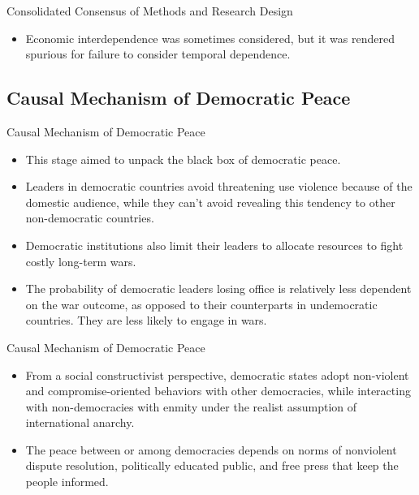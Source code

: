 \documentclass{beamer}
\begin{document}
	\begin{frame}{Consolidated Consensus of Methods and Research Design}
		\begin{itemize}
			\item Economic interdependence was sometimes considered, \autocite{onealClassicalLiberalsWere1997,russettTriangulatingPeaceDemocracy2001} but it was rendered spurious for failure to consider temporal dependence. \autocite{beckTakingTimeSeriously1998}
		\end{itemize}
	\end{frame}
	
	\subsection{Causal Mechanism of Democratic Peace}
	
	\begin{frame}{Causal Mechanism of Democratic Peace}
		\begin{itemize}
			\item This stage aimed to unpack the black box of democratic peace.
			\item Leaders in democratic countries avoid threatening use violence because of the domestic audience, \autocite{fearonDomesticPoliticalAudiences1994} while they can't avoid revealing this tendency to other non-democratic countries. \autocite{schultzDemocracyCoerciveDiplomacy2001}
			\item Democratic institutions also limit their leaders to allocate resources to fight costly long-term wars. \autocite{buenodemesquitaLogicPoliticalSurvival2003}
			\item The probability of democratic leaders losing office is relatively less dependent on the war outcome, as opposed to their counterparts in undemocratic countries. They are less likely to engage in wars. \autocite{debsRegimeTypeFate2010}
		\end{itemize}
	\end{frame}

	\begin{frame}{Causal Mechanism of Democratic Peace}
		\begin{itemize}
			\item From a social constructivist perspective, democratic states adopt non-violent and compromise-oriented behaviors with other democracies, while interacting with non-democracies with enmity under the realist assumption of international anarchy. \autocite{risse-kappenDemocraticPeaceWarlike1995}
			\item The peace between or among democracies depends on norms of nonviolent dispute resolution, politically educated public, and free press that keep the people informed. \autocite{hayesSecuritizationSocialIdentity2012}
		\end{itemize}
	\end{frame}
	
\end{document}

